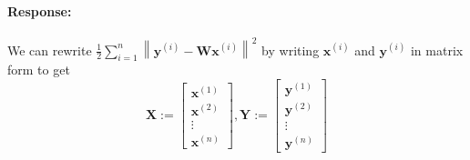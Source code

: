 \documentclass [11pt] {article}
\newcommand{\T}{\bf{T}}
\newcommand{\X}{\bf{X}}
\newcommand{\Y}{\bf{Y}}
\newcommand{\x}{\bf{x}}
\newcommand{\y}{\bf{y}}
\newcommand{\W}{\bf{W}}
\newenvironment{response}{\begin{responseframe}\vspace{-10pt}\paragraph{Response:}}{\end{responseframe}}
\renewcommand{\bf}[1]{\textbf{{#1}}}
\begin{document}
\begin{enumerate}
        \begin{adjustwidth}{-8.4em}{-6em}
            \small{
                \begin{response}
                    We can rewrite $\frac{1}{2} \sum^{n}_{i = 1} \left\| \y^{(i)} - \W \x^{(i)} \right\|^2$
                    by writing $\x^{(i)}$ and $\y^{(i)}$ in matrix form to get
                    \[
                        \X := 
                        \begin{bmatrix}
                            \x^{(1)} \\
                            \x^{(2)} \\
                            \vdots \\
                            \x^{(n)}
                        \end{bmatrix},
                        \Y :=
                        \begin{bmatrix}
                            \y^{(1)} \\
                            \y^{(2)} \\
                            \vdots \\
                            \y^{(n)}
                        \end{bmatrix}
                    \]


\end{response}}
\end{adjustwidth}
\end{enumerate}
\end{document}
